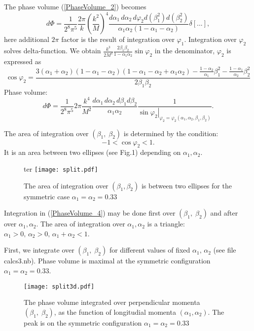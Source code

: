 \documentclass[12pt]{article}
\begin{document}
The phase volume (\ref{PhaseVolume_2}) becomes
\begin{equation}
\label{PhaseVolume_3}
d\Phi = \frac{1}{2^8\pi^5}\frac{2\pi}{k}\left( \frac{k^2}{M}\right)^4 \frac{d\alpha_1\, d\alpha_2\, d\varphi_2 d(\beta_1^2) d(\beta_2^2)}{\alpha_1\alpha_2(1-\alpha_1-\alpha_2)} \delta\left[ ...\right],
\end{equation} 
here additional $2\pi$ factor is the result of integration over $\varphi_1$.
Integration over $\varphi_2$ solves delta-function. We obtain $\frac{k^3}{2M^2}\frac{2\beta_1\beta_2}{1-\alpha_1\alpha_2}\sin\varphi_2$ in the denominator, $\varphi_2$ is expressed as
\begin{equation}
\label{cos_phi_2}
\cos \varphi_2=\frac{3(\alpha_1+\alpha_2)(1-\alpha_1-\alpha_2)(1-\alpha_1-\alpha_2 + \alpha_1\alpha_2) -\frac{1-\alpha_2}{\alpha_1}\beta_1^2 - \frac{1-\alpha_1}{\alpha_2}\beta_2^2  }{2\beta_1\beta_2}
\end{equation}
Phase volume:
\begin{equation}
\label{PhaseVolume_4}
d\Phi = \frac{1}{2^8\pi^5}2\pi\frac{k^4}{M^2} \frac{d\alpha_1\, d\alpha_2\, d\beta_1 d\beta_2}{\alpha_1\alpha_2} \frac{1}{\left. \sin\varphi_2 \right|_{\varphi_2=\varphi_2(\alpha_1,\alpha_2,\beta_1,\beta_2)}}.
\end{equation}

The area of integration over $(\beta_1,\; \beta_2)$ is determined by the condition: 
$$
-1<\cos\varphi_2 <1.
$$
It is an area between two ellipses (see Fig.1) depending on $\alpha_1,\alpha_2$.  
\begin{figure}ter
\centering
\texttt{[image: split.pdf]}
\caption{The area of integration over $(\beta_1,\beta_2)$ is between two ellipses for the symmetric case $\alpha_1=\alpha_2=0.33$}
\end{figure}

Integration in (\ref{PhaseVolume_4}) may be done first over $(\beta_1,\; \beta_2)$ and after over $\alpha_1,\alpha_2$. The area of integration over $\alpha_1,\alpha_2$ is a triangle: $\alpha_1>0,\,\alpha_2>0,\, \alpha_1+\alpha_2<1$. 

First, we integrate over $(\beta_1,\; \beta_2)$ for different values of fixed $\alpha_1,\,\alpha_2$ (see file calcs3.nb). Phase volume is maximal at  the symmetric configuration $\alpha_1=\alpha_2=0.33$.

\begin{figure}
\centering
\texttt{[image: split3d.pdf]}
\caption{The phase volume integrated over perpendicular momenta $(\beta_1,\; \beta_2)$, as the function of longitudial momenta $(\alpha_1,\alpha_2)$. The peak is on the symmetric configuration $\alpha_1=\alpha_2=0.33$ }
\end{figure}
\end{document}
